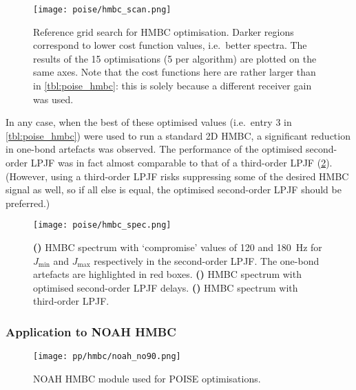 \begin{figure}[htb]
    \centering
    \texttt{[image: poise/hmbc\_scan.png]}
    \caption[Reference grid search for HMBC optimisation]{
        Reference grid search for HMBC optimisation.
        Darker regions correspond to lower cost function values, i.e.\ better spectra.
        The results of the 15 optimisations (5 per algorithm) are plotted on the same axes.
        Note that the cost functions here are rather larger than in \cref{tbl:poise_hmbc}: this is solely because a different receiver gain was used.
    }
    \label{fig:poise_hmbc_scan}
\end{figure}

In any case, when the best of these optimised values (i.e.\ entry 3 in \cref{tbl:poise_hmbc}) were used to run a standard 2D HMBC, a significant reduction in one-bond artefacts was observed.
The performance of the optimised second-order LPJF was in fact almost comparable to that of a third-order LPJF (\cref{fig:poise_hmbc_spec}).
(However, using a third-order LPJF risks suppressing some of the desired HMBC signal as well, so if all else is equal, the optimised second-order LPJF should be preferred.)

\begin{figure}[htb]
    \centering
    \texttt{[image: poise/hmbc\_spec.png]}
    {\label{fig:poise_hmbc_spec_unopt2}}
    {\label{fig:poise_hmbc_spec_opt2}}
    {\label{fig:poise_hmbc_spec_3}}
    \caption[Comparison of HMBC spectra before and after POISE optimisation]{
        \textbf{()} HMBC spectrum with `compromise' values of 120 and \SI{180}{\Hz} for $J_\text{min}$ and $J_\text{max}$ respectively in the second-order LPJF.
        The one-bond artefacts are highlighted in red boxes.
        \textbf{()} HMBC spectrum with optimised second-order LPJF delays.
        \textbf{()} HMBC spectrum with third-order LPJF.
    }
    \label{fig:poise_hmbc_spec}
\end{figure}



\subsubsection{Application to NOAH HMBC}

\begin{figure}[htb]
    \centering
    \texttt{[image: pp/hmbc/noah\_no90.png]}
    \caption[NOAH HMBC module used for POISE optimisations]{
        NOAH HMBC module used for POISE optimisations.
    }
    \label{fig:noah_hmbc_no90}
\end{figure}

